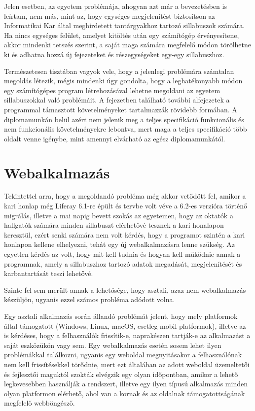 \documentclass[hidelinks, 12pt, a4paper]{report}
\begin{document}
Jelen esetben, az egyetem problémája, ahogyan azt már a bevezetésben is leírtam, nem más, mint az, hogy egységes megjelenítést biztosítson az Informatikai Kar által meghirdetett tantárgyakhoz tartozó sillabuszok számára. Ha nincs egységes felület, amelyet kitöltés után egy számítógép érvényesítene, akkor mindenki tetszés szerint, a saját maga számára megfelelő módon törölhetne ki és adhatna hozzá új fejezeteket és részegységeket egy-egy sillabuszhoz.

Természetesen tisztában vagyok vele, hogy a jelenlegi problémára számtalan megoldás létezik, mégis mindenki úgy gondolta, hogy a leghatékonyabb módon egy számítógépes program létrehozásával lehetne megoldani az egyetem sillabuszokkal való problémáit. A fejezetben található további alfejezetek a programmal támasztott követelményeket tartalmazzák rövidebb formában. A diplomamunkán belül azért nem jelenik meg a teljes specifikáció funkcionális és nem funkcionális követelményekre lebontva, mert maga a teljes specifikáció több oldalt venne igénybe, mint amennyi elvárható az egész diplomamunkától.

\section{Webalkalmazás}

Tekintettel arra, hogy a megoldandó probléma még akkor vetődött fel, amikor a  kari honlap még Liferay 6.1-re épült és tervbe volt véve a 6.2-es verzióra történő migrálás, illetve a mai napig bevett szokás az egyetemen, hogy az oktatók a hallgatók számára minden sillabuszt elérhetővé tesznek a kari honalapon keresztül, ezért senki számára nem volt kérdés, hogy a programot szintén a kari honlapon kellene elhelyezni, tehát egy új webalkalmazásra lenne szükség. Az egyetlen kérdés az volt, hogy mit kell tudnia és hogyan kell működnie annak a programnak, amely a sillabuszhoz tartozó adatok megadását, megjelenítését és karbantartását teszi lehetővé.

Szinte fel sem merült annak a lehetősége, hogy asztali, azaz nem webalkalmazás készüljön, ugyanis ezzel számos probléma adódott volna.

Egy asztali alkalmazás során állandó problémát jelent, hogy mely platformok által támogatott (Windows, Linux, macOS, esetleg mobil platformok), illetve az is kérdéses, hogy a felhasználók frissítik-e, naprakészen tartják-e az alkalmazást a saját eszközükön vagy sem. Egy webalkalmazás esetén sosem lehet ilyen problémákkal találkozni, ugyanis egy weboldal megnyitásakor a felhasználónak nem kell frissítésekkel törődnie, mert ezt általában az adott weboldal üzemeltetői és fejlesztői maguktól szokták elvégzik egy olyan időpontban, amikor a lehető legkevesebben használják a rendszert, illetve egy ilyen típusú alkalmazás minden olyan platformon elérhető, ahol van a kornak és az oldalnak támogatottságának megfelelő webböngésző. 
\end{document}

